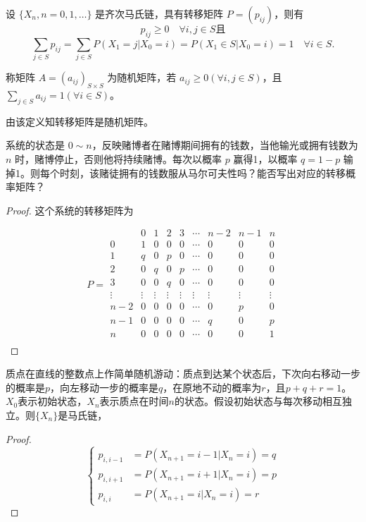 \documentclass[lang=cn,10pt,thmcnt=section]{elegantbook}
\begin{document}
设 $\{X_n, n = 0, 1, \ldots\}$ 是齐次马氏链，具有转移矩阵 $P = (p_{ij})$，则有
\[ p_{ij} \geq 0 \quad \forall i, j \in S \text{且} \]
\[ \sum_{j \in S} p_{ij} = \sum_{j \in S} P(X_1 = j | X_0 = i) = P(X_1 \in S | X_0 = i) = 1 \quad \forall i \in S. \]

\begin{definition}[随机矩阵]
	称矩阵 $A = (a_{ij})_{S \times S}$ 为随机矩阵，若 $a_{ij} \geq 0 (\forall i, j \in S)$，且 $\sum_{j \in S} a_{ij} = 1 (\forall i \in S)$。
\end{definition}

由该定义知转移矩阵是随机矩阵。

\begin{example}[赌徒破产问题]
	系统的状态是 \(0 \sim n\)，反映赌博者在赌博期间拥有的钱数，当他输光或拥有钱数为 \(n\) 时，赌博停止，否则他将持续赌博。每次以概率 \(p\) 赢得1，以概率 \(q = 1 - p\) 输掉1。则每个时刻，该赌徒拥有的钱数服从马尔可夫性吗？能否写出对应的转移概率矩阵？
\end{example}
\begin{proof}
	这个系统的转移矩阵为

\[
P = 
\begin{array}{c|ccccccccc}
 & 0 & 1 & 2 & 3 & \cdots & n-2 & n-1 & n \\
\hline
0 & 1 & 0 & 0 & 0 & \cdots & 0 & 0 & 0 \\
1 & q & 0 & p & 0 & \cdots & 0 & 0 & 0 \\
2 & 0 & q & 0 & p & \cdots & 0 & 0 & 0 \\
3 & 0 & 0 & q & 0 & \cdots & 0 & 0 & 0 \\
\vdots & \vdots & \vdots & \vdots & \vdots & \vdots & \vdots & \vdots & \vdots \\
n-2 & 0 & 0 & 0 & 0 & \cdots & 0 & p & 0 \\
n-1 & 0 & 0 & 0 & 0 & \cdots & q & 0 & p \\
n & 0 & 0 & 0 & 0 & \cdots & 0 & 0 & 1 \\
\end{array}
\]
\end{proof}
\begin{example}[简单随机游动]
	质点在直线的整数点上作简单随机游动：质点到达某个状态后，下次向右移动一步的概率是$p$，向左移动一步的概率是$q$，在原地不动的概率为$r$，且$p + q + r = 1$。$X_0$表示初始状态，$X_n$表示质点在时间$n$的状态。假设初始状态与每次移动相互独立。则$\{X_n\}$是马氏链，
\end{example}
\begin{proof}
	\[
\left\{
\begin{aligned}
p_{i, i-1} &= P(X_{n+1} = i - 1 | X_n = i) = q \\
p_{i, i+1} &= P(X_{n+1} = i + 1 | X_n = i) = p \\
p_{i, i} &= P(X_{n+1} = i | X_n = i) = r
\end{aligned}
\right.
\]
\end{proof}
\end{document}
